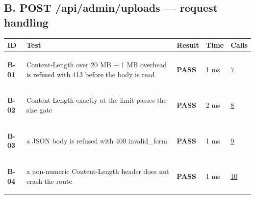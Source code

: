 \documentclass[10pt,a4paper]{article}
\begin{document}
\subsection*{B. POST /api/admin/uploads — request handling}
\begin{longtable}{@{}P{1.2cm}P{9.2cm}P{1.2cm}P{1.3cm}P{2.4cm}@{}}
\toprule \textbf{ID} & \textbf{Test} & \textbf{Result} & \textbf{Time} & \textbf{Calls} \\ \midrule \endhead
\hypertarget{test-B-01}{\textbf{B-01}} & Content-Length over 20 MB + 1 MB overhead is refused with 413 before the body is read & \textcolor{passgreen}{\textbf{PASS}} & 1 ms & \hyperlink{call7}{7} \\
\hypertarget{test-B-02}{\textbf{B-02}} & Content-Length exactly at the limit passes the size gate & \textcolor{passgreen}{\textbf{PASS}} & 2 ms & \hyperlink{call8}{8} \\
\hypertarget{test-B-03}{\textbf{B-03}} & a JSON body is refused with 400 invalid\_form & \textcolor{passgreen}{\textbf{PASS}} & 1 ms & \hyperlink{call9}{9} \\
\hypertarget{test-B-04}{\textbf{B-04}} & a non-numeric Content-Length header does not crash the route & \textcolor{passgreen}{\textbf{PASS}} & 1 ms & \hyperlink{call10}{10} \\
\bottomrule
\end{longtable}
\end{document}
